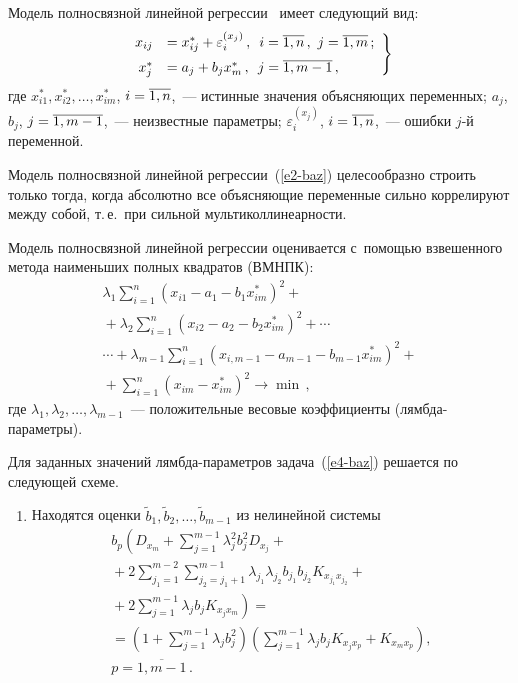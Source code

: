 \begin{multicols}{2}
  Модель полносвязной линейной регрессии~\cite{8-baz, 9-baz} имеет 
следующий вид:
  \begin{equation}
  \left.
  \begin{array}{rl}
  x_{ij} &= x_{ij}^* +\varepsilon_i^{(x_j)}\,, \enskip i=\overline{1,n}\,,\ 
j=\overline{1,m}\,;
 \\[6pt]
  x_j^* &= a_j +b_jx_m^*\,,\enskip j=\overline{1,m-1}\,,
  \end{array}
  \right \}
   \label{e2-baz}
  \end{equation}
где $x_{i1}^*, x_{i2}^*, \ldots , x_{im}^*$, $i\hm= \overline{1,n}$,~--- истинные 
значения объясняющих переменных; $a_j$, $b_j$, $j\hm= \overline{1,m-1}$,~--- 
неизвестные параметры; $\varepsilon_i^{(x_j)}$, $i\hm= \overline{1,n}$,~--- 
ошибки $j$-й переменной.
  
  Модель полносвязной линейной регрессии~(\ref{e2-baz}) 
целесообразно строить только тогда, когда абсолютно все объясняющие 
переменные сильно коррелируют между собой, т.\,е.\ при сильной 
мультиколлинеарности.
  
  Модель полносвязной линейной регрессии оценивается с~по\-мощью 
взвешенного метода наименьших полных квадратов (ВМНПК):
  \begin{multline}
  \lambda_1 \sum\limits^n_{i=1} \left( x_{i1} -a_1-b_1x_{im}^*\right)^2 
+{}\\
{}+\lambda_2 \sum\limits^n_{i=1} \left( x_{i2}-a_2-b_2x_{im}^*\right)^2+\cdots\\
  {}\cdots  + \lambda_{m-1}\sum\limits^n_{i=1} \left( x_{i,m-1} -a_{m-1} -b_{m-1} x^*_{im}\right)^2 +{}\\
  {}+\sum\limits^n_{i=1} \left( x_{im} -x_{im}^*\right)^2\to 
\min\,,
  \label{e4-baz}
  \end{multline}
где $\lambda_1, \lambda_2, \ldots , \lambda_{m-1}$~--- положительные весовые 
коэффициенты (лямб\-да-па\-ра\-мет\-ры).
  
  Для заданных значений лямб\-да-па\-ра\-мет\-ров задача~(\ref{e4-baz}) 
решается по сле\-ду\-ющей схеме.
  \begin{enumerate}[1.]
\item Находятся оценки $\tilde{b}_1, \tilde{b}_2, \ldots , \tilde{b}_{m-1}$ из 
нелинейной системы
\begin{multline*}
b_p\left( D_{x_m} +\sum\limits_{j=1}^{m-1} \lambda_j^2 b_j^2 D_{x_j} 
+{}\right.\\
{}+2\sum\limits_{j_1=1}^{m-2} \sum\limits_{j_2=j_1+1}^{m-1} \lambda_{j_1} 
\lambda_{j_2} b_{j_1} b_{j_2} K_{x_{j_1} x_{j_2}}+{}\\
\left.{}+ 2\sum\limits^{m-1}_{j=1} 
\lambda_j b_j K_{x_j x_m}\right)={}\\
{}= \left( 1+\sum\limits_{j=1}^{m-1} \lambda_j b_j^2\right) \left( 
\sum\limits_{j=1}^{m-1} \lambda_j b_j K_{x_j x_p} +K_{x_m x_p}\right)\!,\\
 p=\overline{1,m-1}\,.
\end{multline*}
  

\end{enumerate}
\end{multicols}
